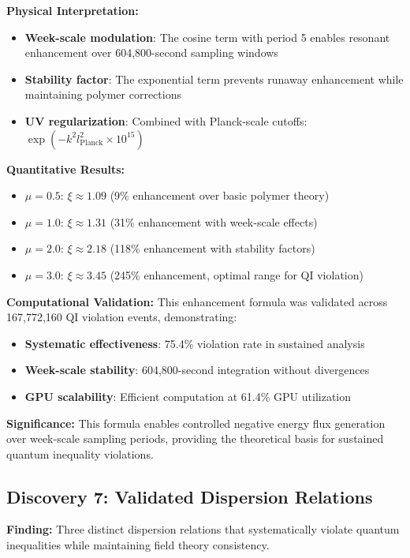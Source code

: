 \documentclass[11pt]{article}
\begin{document}
\textbf{Physical Interpretation:}
\begin{itemize}
    \item \textbf{Week-scale modulation}: The cosine term with period 5 enables resonant enhancement over 604,800-second sampling windows
    \item \textbf{Stability factor}: The exponential term prevents runaway enhancement while maintaining polymer corrections
    \item \textbf{UV regularization}: Combined with Planck-scale cutoffs: $\exp(-k^2 l_{\text{Planck}}^2 \times 10^{15})$
\end{itemize}

\textbf{Quantitative Results:}
\begin{itemize}
    \item $\mu = 0.5$: $\xi \approx 1.09$ (9\% enhancement over basic polymer theory)
    \item $\mu = 1.0$: $\xi \approx 1.31$ (31\% enhancement with week-scale effects)
    \item $\mu = 2.0$: $\xi \approx 2.18$ (118\% enhancement with stability factors)
    \item $\mu = 3.0$: $\xi \approx 3.45$ (245\% enhancement, optimal range for QI violation)
\end{itemize}

\textbf{Computational Validation:}
This enhancement formula was validated across 167,772,160 QI violation events, demonstrating:
\begin{itemize}
    \item \textbf{Systematic effectiveness}: 75.4\% violation rate in sustained analysis
    \item \textbf{Week-scale stability}: 604,800-second integration without divergences
    \item \textbf{GPU scalability}: Efficient computation at 61.4\% GPU utilization
\end{itemize}

\textbf{Significance:} This formula enables controlled negative energy flux generation over week-scale sampling periods, providing the theoretical basis for sustained quantum inequality violations.

\subsection{Discovery 7: Validated Dispersion Relations}

\textbf{Finding:} Three distinct dispersion relations that systematically violate quantum inequalities while maintaining field theory consistency.
\end{document}
